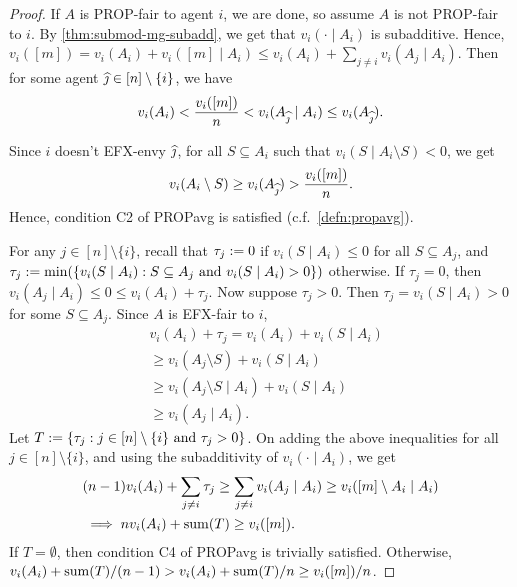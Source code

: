 \begin{proof}
If $A$ is PROP-fair to agent $i$, we are done, so assume $A$ is not PROP-fair to $i$.
By \cref{thm:submod-mg-subadd}, we get that $v_i(\cdot \mid A_i)$ is subadditive.
Hence, $v_i([m]) = v_i(A_i) + v_i([m] \mid A_i) \le v_i(A_i) + \sum_{j \neq i} v_i(A_j \mid A_i)$.
Then for some agent $\widehat{\jmath} \in [n] \setminus \{i\}$, we have
\[ v_i(A_i) < \frac{v_i([m])}{n} < v_i(A_{\widehat{\jmath}} \mid A_i) \le v_i(A_{\widehat{\jmath}}). \]

Since $i$ doesn't EFX-envy $\widehat{\jmath}$, for all $S \subseteq A_i$ such that
$v_i(S \mid A_i \setminus S) < 0$, we get
\[ v_i(A_i \setminus S) \ge v_i(A_{\widehat{\jmath}}) > \frac{v_i([m])}{n}. \]
Hence, condition C2 of PROPavg is satisfied (c.f.~\cref{defn:propavg}).

For any $j \in [n] \setminus \{i\}$, recall that
$\tau_j := 0$ if $v_i(S \mid A_i) \le 0$ for all $S \subseteq A_j$, and
$\tau_j := \min(\{v_i(S \mid A_i): S \subseteq A_j \text{ and } v_i(S \mid A_i) > 0\})$ otherwise.
If $\tau_j = 0$, then $v_i(A_j \mid A_i) \le 0 \le v_i(A_i) + \tau_j$.
Now suppose $\tau_j > 0$. Then $\tau_j = v_i(S \mid A_i) > 0$ for some $S \subseteq A_j$.
Since $A$ is EFX-fair to $i$,
\begin{align*}
& v_i(A_i) + \tau_j
    = v_i(A_i) + v_i(S \mid A_i)
\\ &\ge v_i(A_j \setminus S) + v_i(S \mid A_i)
\\ &\ge v_i(A_j \setminus S \mid A_i) + v_i(S \mid A_i)
    \tag{$v_i$ is submodular}
\\ &\ge v_i(A_j \mid A_i).
    \tag{$v_i(\cdot \mid A_i)$ is subadditive}
\end{align*}
Let $T := \{\tau_j: j \in [n] \setminus \{i\} \text{ and } \tau_j > 0\}$.
On adding the above inequalities for all $j \in [n] \setminus \{i\}$,
and using the subadditivity of $v_i(\cdot \mid A_i)$, we get
\begin{align*}
& (n-1)v_i(A_i) + \sum_{j \neq i}\tau_j
    \relax\ge \sum_{j \neq i} v_i(A_j \mid A_i)
    \ge v_i([m] \setminus A_i \mid A_i)
\\ &\implies nv_i(A_i) + \operatorname{sum}(T) \ge v_i([m]).
\end{align*}
If $T = \emptyset$, then condition C4 of PROPavg is trivially satisfied.
Otherwise, $v_i(A_i) + \operatorname{sum}(T)/(n-1) > v_i(A_i) + \operatorname{sum}(T)/n \ge v_i([m])/n$.
\end{proof}

